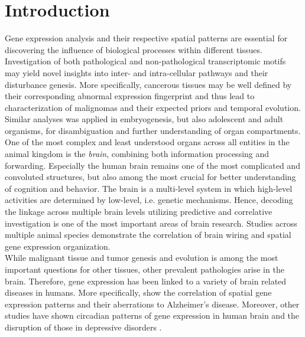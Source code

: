 \documentclass[]{article}
\renewcommand{\cite}{\citep}
\begin{document}
\section{Introduction}
\label{sec:introduction}
Gene expression analysis and their respective spatial patterns are essential for discovering the influence of biological processes within different tissues. Investigation of both pathological and non-pathological transcriptomic motifs may yield novel insights into inter- and intra-cellular pathways and their disturbance genesis. 
More specifically, cancerous tissues may be well defined by their corresponding abnormal expression fingerprint and thus lead to characterization of malignomas and their expected priors and temporal evolution. Similar analyses was applied in embryogenesis, but also adolescent and adult organisms, for disambiguation and further understanding of organ compartments.\\

One of the most complex and least understood organs across all entities in the animal kingdom is the \textit{brain}, combining both information processing and forwarding. Especially the human brain remains one of the most complicated and convoluted structures, but also among the most crucial for better understanding of cognition and behavior. 
The brain is a multi-level system in which high-level activities are determined by low-level, i.e. genetic mechanisms. Hence, decoding the linkage across multiple brain levels utilizing predictive and correlative investigation is one of the most important areas of brain research. Studies across multiple animal species demonstrate the correlation of brain wiring and spatial gene expression organization.\\

While malignant tissue and tumor genesis and evolution is among the most important questions for other tissues, other prevalent pathologies arise in the brain. Therefore, gene expression has been linked to a variety of brain related diseases in humans. More specifically, \citet{twine2011whole} show the correlation of spatial gene expression patterns and their aberrations to Alzheimer's disease. Moreover, other studies have shown circadian patterns of gene expression in human brain and the disruption of those in depressive disorders \cite{li2013circadian}. 
\end{document}
